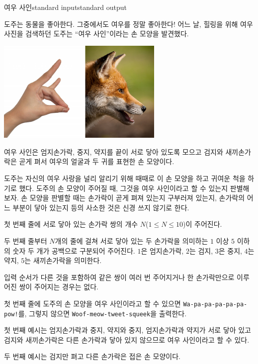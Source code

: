 \begin{problem}{여우 사인}{standard input}{standard output}

도주는 동물을 좋아한다. 그중에서도 여우를 정말 좋아한다! 어느 날, 힐링을 위해 여우 사진을 검색하던 도주는 ``여우 사인''이라는 손 모양을 발견했다.

\begin{center}
  \includegraphics[width=0.6\textwidth]{fox-sign.png}
\end{center}

여우 사인은 엄지손가락, 중지, 약지를 끝이 서로 닿아 있도록 모으고 검지와 새끼손가락은 곧게 펴서 여우의 얼굴과 두 귀를 표현한 손 모양이다.

도주는 자신의 여우 사랑을 널리 알리기 위해 때때로 이 손 모양을 하고 귀여운 척을 하기로 했다. 도주의 손 모양이 주어질 때, 그것을 여우 사인이라고 할 수 있는지 판별해 보자. 손 모양을 판별할 때는 손가락이 곧게 펴져 있는지 구부러져 있는지, 손가락의 어느 부분이 닿아 있는지 등의 사소한 것은 신경 쓰지 않기로 한다.

\InputFile
첫 번째 줄에 서로 닿아 있는 손가락 쌍의 개수 $N$($1 \le N \le 10$)이 주어진다.

두 번째 줄부터 $N$개의 줄에 걸쳐 서로 닿아 있는 두 손가락을 의미하는 $1$ 이상 $5$ 이하의 숫자 두 개가 공백으로 구분되어 주어진다. $1$은 엄지손가락, $2$는 검지, $3$은 중지, $4$는 약지, $5$는 새끼손가락을 의미한다.

입력 순서가 다른 것을 포함하여 같은 쌍이 여러 번 주어지거나 한 손가락만으로 이루어진 쌍이 주어지는 경우는 없다.

\OutputFile
첫 번째 줄에 도주의 손 모양을 여우 사인이라고 할 수 있으면 \texttt{Wa-pa-pa-pa-pa-pa-pow!}를, 그렇지 않으면 \texttt{Woof-meow-tweet-squeek}을 출력한다.

\Example

\begin{example}
%
%
\end{example}

\Notes
첫 번째 예시는 엄지손가락과 중지, 약지와 중지, 엄지손가락과 약지가 서로 닿아 있고 검지와 새끼손가락은 다른 손가락과 닿아 있지 않으므로 여우 사인이라고 할 수 있다.

두 번째 예시는 검지만 펴고 다른 손가락은 접은 손 모양이다.

\end{problem}
